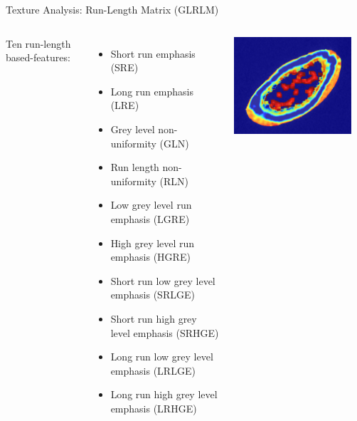 \documentclass[10pt,aspectratio=169]{beamer}
\begin{document}
\begin{frame}{Texture Analysis: Run-Length Matrix (GLRLM)}
  \begin{columns}[onlytextwidth]
    Ten run-length based-features:
    \begin{itemize}
       \item Short run emphasis (SRE)
       \item Long run emphasis (LRE)
       \item Grey level non-uniformity (GLN)
       \item Run length non-uniformity (RLN)
       \item Low grey level run emphasis (LGRE)
       \item High grey level run emphasis (HGRE)
       \item Short run low grey level emphasis (SRLGE)
       \item Short run high grey level emphasis (SRHGE)
       \item Long run low grey level emphasis (LRLGE)
       \item Long run high grey level emphasis (LRHGE)
    \end{itemize}
    \begin{columns}
    \centering
    \centering
    \includegraphics[width=0.9\textwidth]{./TextureMapsImages/GLRLM_49_LEFT_0_crop.png}\\

\end{columns}
\end{columns}
\end{frame}
\end{document}
